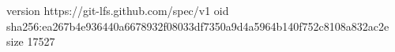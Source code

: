 version https://git-lfs.github.com/spec/v1
oid sha256:ea267b4e936440a6678932f08033df7350a9d4a5964b140f752c8108a832ac2e
size 17527
